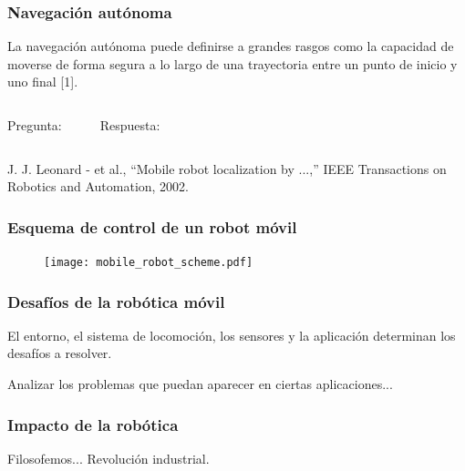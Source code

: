 \begin{frame}
    \frametitle{Navegación autónoma}
    \begin{block}{}
        La navegación autónoma puede definirse a grandes rasgos como la capacidad de moverse de forma segura a lo largo de una trayectoria entre un punto de inicio y uno final [1].
    \end{block}
    \vspace{5mm}
    \footnotesize
    \begin{columns}[t]
        \hspace{13pt}Pregunta:
        \begin{enumerate}
        \end{enumerate}
        Respuesta:
        \begin{enumerate}[$\rightarrow$]
        \end{enumerate}
    \end{columns}
    \vfill
    \begin{tiny}
        [1] J. J. Leonard - et al., ``Mobile robot localization by ...,'' IEEE Transactions on Robotics and Automation, 2002.
    \end{tiny}
\end{frame}

\begin{frame}
    \frametitle{Esquema de control de un robot móvil}
    \begin{figure}[!h]
    	\texttt{[image: mobile\_robot\_scheme.pdf]}
    \end{figure}
\end{frame}

\begin{frame}
    \frametitle{Desafíos de la robótica móvil}

    El entorno, el sistema de locomoción, los sensores y la aplicación determinan los desafíos a resolver.

    \vspace{1em}

    Analizar los problemas que puedan aparecer en ciertas aplicaciones...

\end{frame}

\begin{frame}
    \frametitle{Impacto de la robótica}

    Filosofemos...
    Revolución industrial.

\end{frame}
